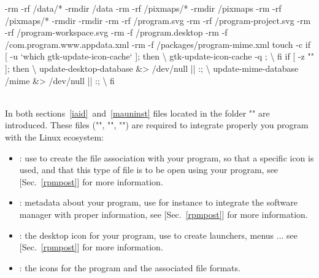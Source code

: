 {\footnotesize{
\begin{script}
\tabul -rm -rf /data/*
\tabul -rmdir /data
\tabul -rm -rf /pixmaps/*
\tabul -rmdir /pixmaps
\tabul -rm -rf /pixmaps/*
\tabul -rmdir 
\tabul -rmdir 
\tabul -rm -rf /program.svg
\tabul -rm -rf /program-project.svg
\tabul -rm -rf /program-workspace.svg
\tabul -rm -f /program.desktop
\tabul -rm -f /com.program.www.appdata.xml
\tabul -rm -f /packages/program-mime.xml
\tabul touch -c 
\tabul if [ -u `which gtk-update-icon-cache` ]; then \textbackslash
\tabul   gtk-update-icon-cache -q ; \textbackslash
\tabul fi
\tabul if [ -z "" ]; then \textbackslash
\tabul \tabul update-desktop-database  &> /dev/null || :; \textbackslash
\tabul \tabul update-mime-database /mime &> /dev/null || :; \textbackslash
\tabul fi
\end{script}
}}
\\
\noindent In both sections~\ref{iaid}~and~\ref{mauninst} files located in the folder "" are introduced.
These files ("", "", "") are required to integrate properly you program with the Linux ecosystem:
\begin{itemize}
\item {}: use to create the file association with your program, so that a specific icon is used, and that this type of file is to be open using your program, see [Sec.~\ref{rpmpost}] for more information. 
\item {}: metadata about your program, use for instance to integrate the software manager with proper information, see [Sec.~\ref{rpmpost}] for more information.
\item {}: the desktop icon for your program, use to create launchers, menus ... see [Sec.~\ref{rpmpost}] for more information.
\item {}: the icons for the program and the associated file formats.
\end{itemize}

